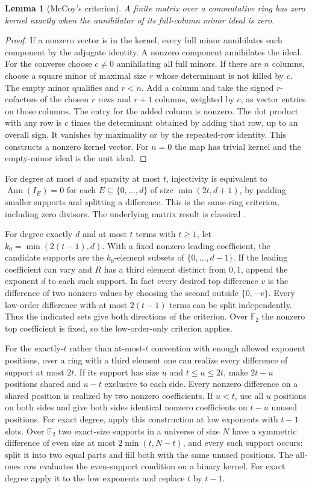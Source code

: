 \documentclass[10pt]{article}
\newtheorem{lemma}[theorem]{Lemma}
\newcommand{\Fp}{\mathbb F}
\newcommand{\ann}{\operatorname{Ann}}
\begin{document}
\begin{lemma}[McCoy's criterion]\label{lem:mccoy}
A finite matrix over a commutative ring has zero kernel exactly when
the annihilator of its full-column minor ideal is zero.
\end{lemma}
\begin{proof}
If a nonzero vector is in the kernel, every full minor annihilates
each component by the adjugate identity. A nonzero component
annihilates the ideal. For the converse choose $c\ne0$ annihilating
all full minors. If there are $n$ columns, choose a square minor of
maximal size $r$ whose determinant is not killed by $c$. The empty
minor qualifies and $r<n$. Add a column and take the signed
$r$-cofactors of the chosen $r$ rows and $r+1$ columns, weighted by
$c$, as vector entries on those columns. The entry for the added
column is nonzero. The dot product with any row is $c$ times the
determinant obtained by adding that row, up to an overall sign.
It vanishes by maximality or by the repeated-row identity. This
constructs a nonzero kernel vector. For $n=0$ the map has trivial
kernel and the empty-minor ideal is the unit ideal.
\end{proof}

For degree at most $d$ and sparsity at most $t$, injectivity is
equivalent to $\ann(I_E)=0$ for each $E\subseteq\{0,\ldots,d\}$ of
size $\min(2t,d+1)$, by padding smaller supports and splitting a
difference. This is the same-ring criterion, including zero divisors.
The underlying matrix result is classical \cite{mccoy}.

For degree exactly $d$ and at most $t$ terms with $t\ge1$, let
$k_0=\min(2(t-1),d)$. With a fixed nonzero leading coefficient,
the candidate supports are the $k_0$-element subsets of
$\{0,\ldots,d-1\}$. If the leading coefficient can vary and
$R$ has a third element distinct from $0,1$, append the exponent $d$
to each such support. In fact every desired top difference $v$ is
the difference of two nonzero values by choosing the second outside
$\{0,-v\}$. Every low-order difference with at most $2(t-1)$
terms can be split independently. Thus the indicated sets give
both directions of the criterion. Over $\Fp_2$ the nonzero top
coefficient is fixed, so the low-order-only criterion applies.

For the exactly-$t$ rather than at-most-$t$ convention with
enough allowed exponent positions, over a ring with a third element
one can realize every difference of support at most $2t$.
If its support has size $u$ and $t\le u\le2t$, make $2t-u$
positions shared and $u-t$ exclusive to each side. Every nonzero
difference on a shared position is realized by two nonzero
coefficients. If $u<t$, use all $u$ positions on both sides
and give both sides identical nonzero coefficients on $t-u$
unused positions. For exact degree, apply this construction at
low exponents with $t-1$ slots. Over $\Fp_2$ two exact-size
supports in a universe of size $N$ have a symmetric difference of
even size at most $2\min(t,N-t)$, and every such support occurs:
split it into two equal parts and fill both with the same unused
positions. The all-ones row evaluates the even-support condition
on a binary kernel. For exact degree apply it to the low
exponents and replace $t$ by $t-1$.
\end{document}

